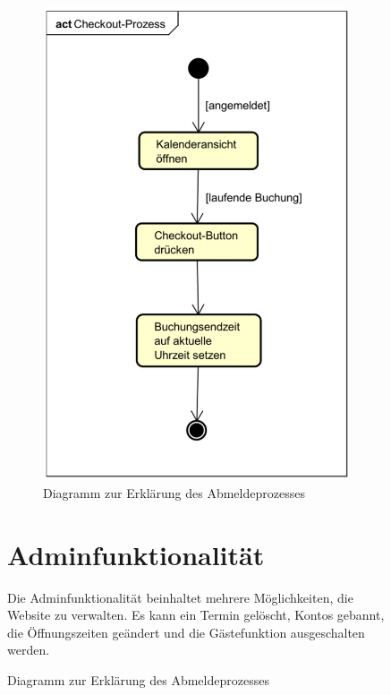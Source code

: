 \begin{figure}[ht]
\begin{figure}[ht]
    \centering
    \includegraphics[width=\textwidth]{figures/activity/checkoutprozess}
    \caption{Diagramm zur Erklärung des Abmeldeprozesses}
    \label{fig:logout-diagram}
\end{figure}

\clearpage

\section{Adminfunktionalität}

Die Adminfunktionalität beinhaltet mehrere Möglichkeiten, die Website zu verwalten.
Es kann ein Termin gelöscht, Kontos gebannt, die Öffnungszeiten geändert und die Gästefunktion
ausgeschalten werden.


\end{figure}
